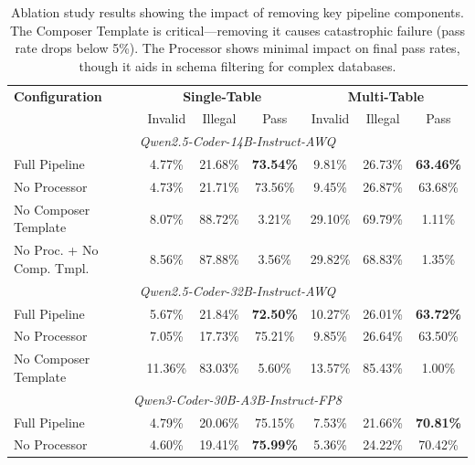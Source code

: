 \documentclass[a4paper,oneside,bibliography=totoc]{scrbook}
\begin{document}
\begin{table}[h!]
\centering
\begin{tabular}{lccc|ccc}
\toprule
\textbf{Configuration} & \multicolumn{3}{c|}{\textbf{Single-Table}} & \multicolumn{3}{c}{\textbf{Multi-Table}} \\
 & Invalid & Illegal & Pass & Invalid & Illegal & Pass \\
\midrule
\multicolumn{7}{c}{\textit{Qwen2.5-Coder-14B-Instruct-AWQ}} \\
\midrule
Full Pipeline & 4.77\% & 21.68\% & \textbf{73.54\%} & 9.81\% & 26.73\% & \textbf{63.46\%} \\
No Processor & 4.73\% & 21.71\% & 73.56\% & 9.45\% & 26.87\% & 63.68\% \\
No Composer Template & 8.07\% & 88.72\% & 3.21\% & 29.10\% & 69.79\% & 1.11\% \\
No Proc. + No Comp. Tmpl. & 8.56\% & 87.88\% & 3.56\% & 29.82\% & 68.83\% & 1.35\% \\
\midrule
\multicolumn{7}{c}{\textit{Qwen2.5-Coder-32B-Instruct-AWQ}} \\
\midrule
Full Pipeline & 5.67\% & 21.84\% & \textbf{72.50\%} & 10.27\% & 26.01\% & \textbf{63.72\%} \\
No Processor & 7.05\% & 17.73\% & 75.21\% & 9.85\% & 26.64\% & 63.50\% \\
No Composer Template & 11.36\% & 83.03\% & 5.60\% & 13.57\% & 85.43\% & 1.00\% \\
\midrule
\multicolumn{7}{c}{\textit{Qwen3-Coder-30B-A3B-Instruct-FP8}} \\
\midrule
Full Pipeline & 4.79\% & 20.06\% & 75.15\% & 7.53\% & 21.66\% & \textbf{70.81\%} \\
No Processor & 4.60\% & 19.41\% & \textbf{75.99\%} & 5.36\% & 24.22\% & 70.42\% \\
\bottomrule
\end{tabular}
\caption{Ablation study results showing the impact of removing key pipeline components. The Composer Template is critical---removing it causes catastrophic failure (pass rate drops below 5\%). The Processor shows minimal impact on final pass rates, though it aids in schema filtering for complex databases.}
\label{tab:ablation_results}
\end{table}
\end{document}
